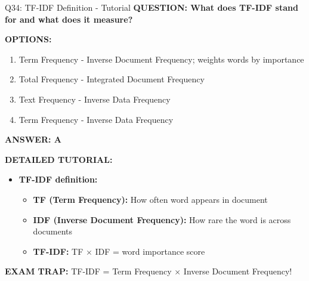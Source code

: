 \documentclass[8pt]{beamer}
\begin{document}
	\begin{frame}{Q34: TF-IDF Definition - Tutorial}
		\fontsize{6.5}{7.5}\selectfont
		\textbf{QUESTION: What does TF-IDF stand for and what does it measure?}
		
		\vspace{0.1cm}
		\textbf{OPTIONS:}
		\begin{enumerate}
			\item Term Frequency - Inverse Document Frequency; weights words by importance
			\item Total Frequency - Integrated Document Frequency
			\item Text Frequency - Inverse Data Frequency
			\item Term Frequency - Inverse Data Frequency
		\end{enumerate}
		
		\vspace{0.1cm}
		\textcolor{myblue}{\textbf{ANSWER: A}}
		
		\vspace{0.1cm}
		\textbf{DETAILED TUTORIAL:}
		\begin{itemize}
			\item \textbf{TF-IDF definition:}
			\begin{itemize}
				\item \textbf{TF (Term Frequency):} How often word appears in document
				\item \textbf{IDF (Inverse Document Frequency):} How rare the word is across documents
				\item \textbf{TF-IDF:} TF $\times$ IDF = word importance score
			\end{itemize}
		\end{itemize}
		
		\textcolor{myred}{\textbf{EXAM TRAP:}} TF-IDF = \textcolor{myblue}{Term Frequency $\times$ Inverse Document Frequency}!
	\end{frame}
	
\end{document}
